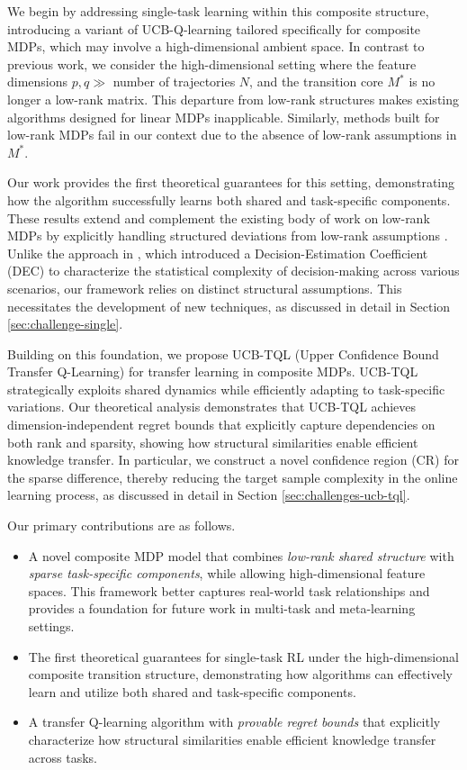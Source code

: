 We begin by addressing single-task learning within this composite structure, introducing a variant of UCB-Q-learning tailored specifically for composite MDPs, which may involve a high-dimensional ambient space. In contrast to previous work, we consider the high-dimensional setting where the feature dimensions $p, q \gg$ number of trajectories $N$, and the transition core $M^*$ is no longer a low-rank matrix. This departure from low-rank structures makes existing algorithms designed for linear MDPs inapplicable. 
Similarly, methods built for low-rank MDPs fail in our context due to the absence of low-rank assumptions in $M^*$. 

Our work provides the first theoretical guarantees for this setting, demonstrating how the algorithm successfully learns both shared and task-specific components. These results extend and complement the existing body of work on low-rank MDPs by explicitly handling structured deviations from low-rank assumptions \citep{du2019good, lattimore2020learning}. Unlike the approach in \cite{foster2021statistical}, which introduced a Decision-Estimation Coefficient (DEC) to characterize the statistical complexity of decision-making across various scenarios, our framework relies on distinct structural assumptions. This necessitates the development of new techniques, as discussed in detail in Section \ref{sec:challenge-single}.

Building on this foundation, we propose UCB-TQL (Upper Confidence Bound Transfer Q-Learning) for transfer learning in composite MDPs. UCB-TQL strategically exploits shared dynamics while efficiently adapting to task-specific variations. Our theoretical analysis demonstrates that UCB-TQL achieves dimension-independent regret bounds that explicitly capture dependencies on both rank and sparsity, showing how structural similarities enable efficient knowledge transfer.
In particular, we construct a novel confidence region (CR) for the sparse difference, thereby reducing the target sample complexity in the online learning process, as discussed in detail in Section \ref{sec:challenges-ucb-tql}. 

Our primary contributions are as follows. 
\begin{itemize}
\item A novel composite MDP model that combines {\em low-rank shared structure} with {\em sparse task-specific components}, while allowing high-dimensional feature spaces. This framework better captures real-world task relationships and provides a foundation for future work in multi-task and meta-learning settings.
\item The first theoretical guarantees for single-task RL under the high-dimensional composite transition structure, demonstrating how algorithms can effectively learn and utilize both shared and task-specific components.
\item A transfer Q-learning algorithm with {\em provable regret bounds} that explicitly characterize how structural similarities enable efficient knowledge transfer across tasks.
\end{itemize}

